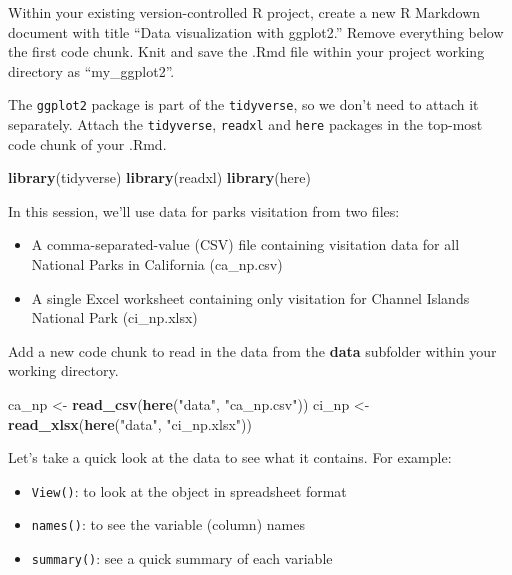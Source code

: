 \documentclass[]{book}
\newenvironment{Shaded}{\begin{snugshade}}{\end{snugshade}}
\newcommand{\KeywordTok}[1]{\textcolor[rgb]{0.13,0.29,0.53}{\textbf{#1}}}
\newcommand{\NormalTok}[1]{#1}
\newcommand{\StringTok}[1]{\textcolor[rgb]{0.31,0.60,0.02}{#1}}
\providecommand{\tightlist}{%
  \setlength{\itemsep}{0pt}\setlength{\parskip}{0pt}}
\begin{document}
Within your existing version-controlled R project, create a new R Markdown document with title ``Data visualization with ggplot2.'' Remove everything below the first code chunk. Knit and save the .Rmd file within your project working directory as ``my\_ggplot2''.

The \texttt{ggplot2} package is part of the \texttt{tidyverse}, so we don't need to attach it separately. Attach the \texttt{tidyverse}, \texttt{readxl} and \texttt{here} packages in the top-most code chunk of your .Rmd.

\begin{Shaded}
\begin{Highlighting}[]
\KeywordTok{library}\NormalTok{(tidyverse)}
\KeywordTok{library}\NormalTok{(readxl)}
\KeywordTok{library}\NormalTok{(here)}
\end{Highlighting}
\end{Shaded}

In this session, we'll use data for parks visitation from two files:

\begin{itemize}
\tightlist
\item
  A comma-separated-value (CSV) file containing visitation data for all National Parks in California (ca\_np.csv)
\item
  A single Excel worksheet containing only visitation for Channel Islands National Park (ci\_np.xlsx)
\end{itemize}

Add a new code chunk to read in the data from the \textbf{data} subfolder within your working directory.

\begin{Shaded}
\begin{Highlighting}[]
\NormalTok{ca_np <-}\StringTok{ }\KeywordTok{read_csv}\NormalTok{(}\KeywordTok{here}\NormalTok{(}\StringTok{"data"}\NormalTok{, }\StringTok{"ca_np.csv"}\NormalTok{))}
\NormalTok{ci_np <-}\StringTok{ }\KeywordTok{read_xlsx}\NormalTok{(}\KeywordTok{here}\NormalTok{(}\StringTok{"data"}\NormalTok{, }\StringTok{"ci_np.xlsx"}\NormalTok{))}
\end{Highlighting}
\end{Shaded}

Let's take a quick look at the data to see what it contains. For example:

\begin{itemize}
\tightlist
\item
  \texttt{View()}: to look at the object in spreadsheet format
\item
  \texttt{names()}: to see the variable (column) names
\item
  \texttt{summary()}: see a quick summary of each variable
\end{itemize}
\end{document}
